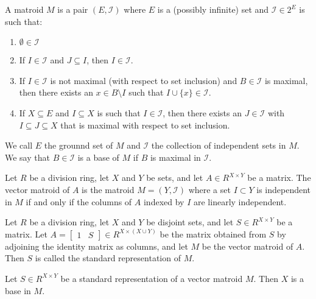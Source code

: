 \begin{definition}
    \label{Matroid}
    \leanok
    A matroid $M$ is a pair $(E, \mathcal{I})$ where $E$ is a (possibly infinite) set and $\mathcal I \in 2^E$ is such that:
    \begin{enumerate}
        \item $\emptyset \in \mathcal I$
        \item If $I \in \mathcal I$ and $J \subseteq I$, then $I \in \mathcal I$.
        \item If $I \in \mathcal I$ is not maximal (with respect to set inclusion) and $B \in \mathcal I$ is maximal,
            then there exists an $x \in B \setminus I$ such that $I \cup \{x\} \in \mathcal{I}$.
        \item If $X \subseteq E$ and $I \subseteq X$ is such that $I \in \mathcal I$, then there exists an $J \in \mathcal I$ with $I \subseteq J \subseteq X$
            that is maximal with respect to set inclusion.
    \end{enumerate}
    We call $E$ the grounnd set of $M$ and $\mathcal{I}$ the collection of independent sets in $M$. We say that $B \in \mathcal I$ is a base of $M$ if $B$ is maximal in $\mathcal I$.
\end{definition}

\begin{definition}
    \label{VectorMatroid}
    \leanok
    Let $R$ be a division ring, let $X$ and $Y$ be sets, and let $A \in R^{X \times Y}$ be a matrix. The vector matroid of $A$ is the matroid $M = (Y, \mathcal{I})$ where a set $I \subset Y$ is independent in $M$ if and only if the columns of $A$ indexed by $I$ are linearly independent.
\end{definition}

\begin{definition}
    \label{StandardRepr}
    \leanok
    Let $R$ be a division ring, let $X$ and $Y$ be disjoint sets, and let $S \in R^{X \times Y}$ be a matrix. Let $A = \begin{bmatrix} 1 & S \end{bmatrix} \in R^{X \times (X \cup Y)}$ be the matrix obtained from $S$ by adjoining the identity matrix as columns, and let $M$ be the vector matroid of $A$. Then $S$ is called the standard representation of $M$.
\end{definition}

\begin{lemma}
    \label{StandardRepr.toMatroid_isBase_X}
    \leanok
    Let $S \in R^{X \times Y}$ be a standard representation of a vector matroid $M$. Then $X$ is a base in $M$.
\end{lemma}


